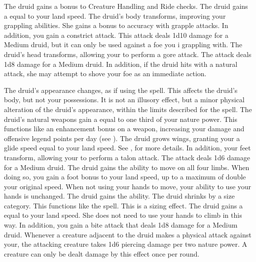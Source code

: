         The druid gains a  bonus to Creature Handling and Ride checks.
        The druid gains a  equal to your land speed.
        The druid's body transforms, improving your grappling abilities.
        She gains a  bonus to accuracy with grapple attacks.
        In addition, you gain a constrict attack.
        This attack deals 1d10 damage for a Medium druid, but it can only be used against a foe you i grappling with.
        The druid's head transforms, allowing your to perform a gore attack.
        The attack deals 1d8 damage for a Medium druid.
        In addition, if the druid hits with a natural attack, she may attempt to shove your foe as an immediate action.

        The druid's appearance changes, as if using the  spell.
        This affects the druid's body, but not your possessions.
        It is not an illusory effect, but a minor physical alteration of the druid's appearance, within the limits described for the spell.
        The druid's natural weapons gain a  equal to one third of your nature power.
        This functions like an enhancement bonus on a weapon, increasing your damage and offensive legend points per day (see ).
        The druid grows wings, granting your a glide speed equal to your land speed.
        See , for more details.
        In addition, your feet transform, allowing your to perform a talon attack.
        The attack deals 1d6 damage for a Medium druid.
        The druid gains the ability to move on all four limbs.
        When doing so, you gain a  foot bonus to your land speed, up to a maximum of double your original speed.
        When not using your hands to move, your ability to use your hands is unchanged.
        The druid gains the  ability.
        The druid shrinks by a size category.
        This functions like the  spell.
        This is a sizing effect.
        The druid gains a  equal to your land speed.
        She does not need to use your hands to climb in this way.
        In addition, you gain a bite attack that deals 1d8 damage for a Medium druid.
        Whenever a creature adjacent to the druid makes a physical attack against your, the attacking creature takes 1d6 piercing damage per two nature power.
        A creature can only be dealt damage by this effect once per round.

